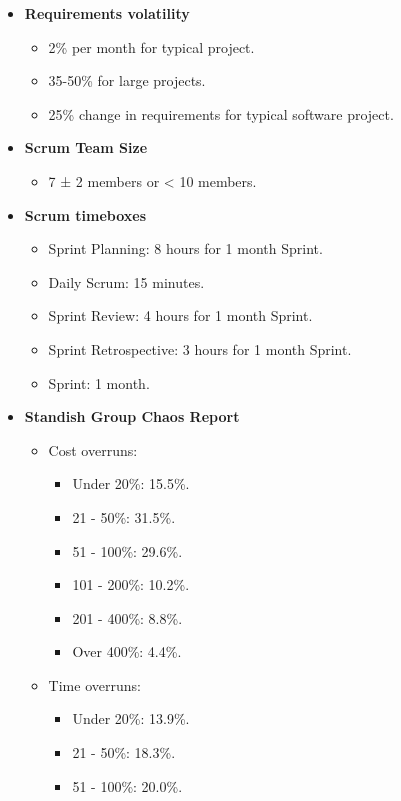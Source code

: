 \documentclass[10pt]{article}
\begin{document}
\begin{multicols}{5}
\begin{block}
  \begin{itemize}
    \item \textbf{Requirements volatility}
    \begin{itemize}
      \item 2\% per month for typical project.
      \item 35-50\% for large projects.
      \item 25\% change in requirements for typical software project.
    \end{itemize}
    \item \textbf{Scrum Team Size}
    \begin{itemize}
      \item 7 ± 2 members or < 10 members.
    \end{itemize}
    \item \textbf{Scrum timeboxes}
    \begin{itemize}
      \item Sprint Planning: 8 hours for 1 month Sprint.
      \item Daily Scrum: 15 minutes.
      \item Sprint Review: 4 hours for 1 month Sprint.
      \item Sprint Retrospective: 3 hours for 1 month Sprint.
      \item Sprint: 1 month.
    \end{itemize}
    \item \textbf{Standish Group Chaos Report}
    \begin{itemize}
      \item Cost overruns:
      \begin{itemize}
        \item Under 20\%: 15.5\%.
        \item 21 - 50\%: 31.5\%.
        \item 51 - 100\%: 29.6\%.
        \item 101 - 200\%: 10.2\%.
        \item 201 - 400\%: 8.8\%.
        \item Over 400\%: 4.4\%.
      \end{itemize}
      \item Time overruns:
      \begin{itemize}
        \item Under 20\%: 13.9\%.
        \item 21 - 50\%: 18.3\%.
        \item 51 - 100\%: 20.0\%.

\end{itemize}
\end{itemize}
\end{itemize}
\end{block}
\end{multicols}
\end{document}
